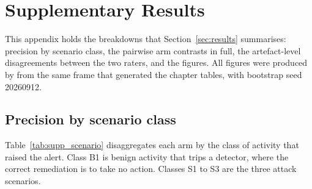 \section{Supplementary Results}
\label{app:supp}

This appendix holds the breakdowns that Section~\ref{sec:results} summarises: precision
by scenario class, the pairwise arm contrasts in full, the artefact-level disagreements
between the two raters, and the figures. All figures were produced by
 from the same frame that generated the chapter tables,
with bootstrap seed \num{20260912}.

\subsection{Precision by scenario class}
\label{app:supp:scenario}

Table~\ref{tab:supp_scenario} disaggregates each arm by the class of activity that
raised the alert. Class B1 is benign activity that trips a detector, where the correct
remediation is to take no action. Classes S1 to S3 are the three attack scenarios.


